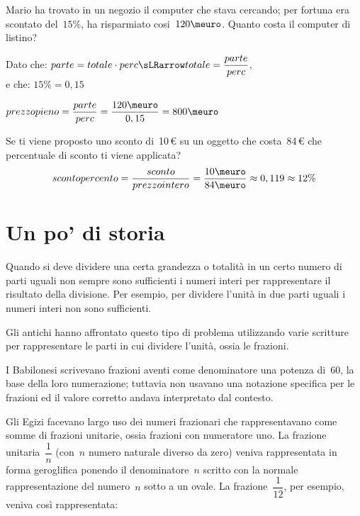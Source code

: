 \begin{esempio}{}{}
Mario ha trovato in un negozio il computer che stava cercando; per fortuna 
era scontato del~\(15\%\), ha risparmiato cosi~\(120\meuro\). 
Quanto costa il computer di listino?

Dato che: 
\(parte = totale \cdot perc \sLRarrow 
  totale = \dfrac{parte}{perc}\), \\
e che: \(15\% = 0,15\)

\(prezzo pieno = \dfrac{parte}{perc} = 
  \dfrac{120\meuro}{0,15} = 800\meuro\)
\end{esempio}

\begin{esempio}{}{}
 Se ti viene proposto uno sconto di~10\,€ su un oggetto che costa~84\,€ che 
percentuale di sconto ti viene applicata?
\[sconto percento = \frac{sconto}{prezzointero} =
  \frac{10\meuro}{84\meuro} \approx
  0,119 \approx 12\%\]
\end{esempio}



\section{Un po' di  storia}

Quando si deve dividere una certa grandezza o totalità in un certo numero di 
parti uguali non sempre sono sufficienti i numeri interi per rappresentare 
il risultato della divisione. Per esempio, per dividere l'unità in due parti 
uguali i numeri interi non sono sufficienti.

Gli antichi hanno affrontato questo tipo di problema utilizzando varie 
scritture per rappresentare le parti in cui dividere l'unità, ossia le 
frazioni.

I Babilonesi scrivevano frazioni aventi come denominatore una potenza di~60, 
la base della loro numerazione; tuttavia non usavano una notazione specifica 
per le frazioni ed il valore corretto andava interpretato dal contesto.

Gli Egizi facevano largo uso dei numeri frazionari che rappresentavano come 
somme di frazioni unitarie, ossia frazioni con numeratore uno. 
La frazione unitaria~\(\dfrac{1}{n}\) (con~\(n\) numero naturale diverso da 
zero)
veniva rappresentata in forma geroglifica ponendo il denominatore~\(n\) 
scritto 
con la normale rappresentazione del numero~\(n\) sotto a un ovale. 
La frazione~\(\dfrac{1}{12}\), per esempio, veniva così rappresentata:


